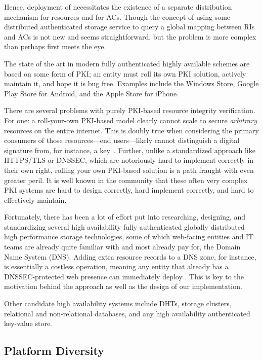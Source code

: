 Hence, deployment of \SYSTEM{} necessitates the existence of a separate
distribution mechanism for resources and for ACs. Though the concept of using
some distributed authenticated storage service to query a global mapping between
RIs and ACs is not new and seems straightforward, but the problem is more
complex than perhaps first meets the eye.

The state of the art in modern fully authenticated highly available schemes are
based on some form of PKI; an entity must roll its own PKI solution,
actively maintain it, and hope it is bug free. Examples include the Windows
Store, Google Play Store for Android, and the Apple Store for iPhone.

There are several problems with purely PKI-based resource integrity
verification. For one: a roll-your-own PKI-based model clearly cannot scale to
secure \emph{arbitrary} resources on the entire internet. This is doubly true
when considering the primary consumers of those resources---end users---likely
cannot distinguish a digital signature from, for instance, a key~\cite{PGPBad}.
Further, unlike a standardized approach like HTTPS/TLS or DNSSEC, which are
notoriously hard to implement correctly in their own right, rolling your own
PKI-based solution is a path fraught with even greater peril. It is well known
in the community that these often very complex PKI systems are hard to design
correctly, hard implement correctly, and hard to effectively maintain.

Fortunately, there has been a lot of effort put into researching, designing, and
standardizing several high availability fully authenticated globally distributed
high performance storage technologies, some of which web-facing entities and IT
teams are already quite familiar with and most already pay for, \eg the Domain
Name System (DNS). Adding extra resource records to a DNS zone, for instance, is
essentially a costless operation, meaning any entity that already has a
DNSSEC-protected web presence can immediately deploy \SYSTEM{}. This is key to
the motivation behind the \SYSTEM{} approach as well as the design of our
\DNSSYS{} implementation.

Other candidate high availability systems include DHTs, storage clusters,
relational and non-relational databases, and any high availability authenticated
key-value store.

\subsection{Platform Diversity}

